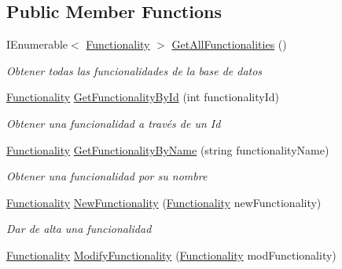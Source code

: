 \subsection*{Public Member Functions}
\begin{DoxyCompactItemize}
\item 
I\+Enumerable$<$ \hyperlink{class_h_k_supply_1_1_models_1_1_functionality}{Functionality} $>$ \hyperlink{class_h_k_supply_1_1_services_1_1_implementations_1_1_e_f_functionality_ab92f666d01076cffafbddbb91c5cf6af}{Get\+All\+Functionalities} ()
\begin{DoxyCompactList}\small\item\em Obtener todas las funcionalidades de la base de datos \end{DoxyCompactList}\item 
\hyperlink{class_h_k_supply_1_1_models_1_1_functionality}{Functionality} \hyperlink{class_h_k_supply_1_1_services_1_1_implementations_1_1_e_f_functionality_a0aa6fc75b8f1ddf6532f39a84bc50ad9}{Get\+Functionality\+By\+Id} (int functionality\+Id)
\begin{DoxyCompactList}\small\item\em Obtener una funcionalidad a través de un Id \end{DoxyCompactList}\item 
\hyperlink{class_h_k_supply_1_1_models_1_1_functionality}{Functionality} \hyperlink{class_h_k_supply_1_1_services_1_1_implementations_1_1_e_f_functionality_a655784ce048904e9f27a827ccf2a7a79}{Get\+Functionality\+By\+Name} (string functionality\+Name)
\begin{DoxyCompactList}\small\item\em Obtener una funcionalidad por su nombre \end{DoxyCompactList}\item 
\hyperlink{class_h_k_supply_1_1_models_1_1_functionality}{Functionality} \hyperlink{class_h_k_supply_1_1_services_1_1_implementations_1_1_e_f_functionality_a43852b181d280c78c7c00b9d11c6d6c4}{New\+Functionality} (\hyperlink{class_h_k_supply_1_1_models_1_1_functionality}{Functionality} new\+Functionality)
\begin{DoxyCompactList}\small\item\em Dar de alta una funcionalidad \end{DoxyCompactList}\item 
\hyperlink{class_h_k_supply_1_1_models_1_1_functionality}{Functionality} \hyperlink{class_h_k_supply_1_1_services_1_1_implementations_1_1_e_f_functionality_ae4f83037cd6ef526f55de1a2ba442cc6}{Modify\+Functionality} (\hyperlink{class_h_k_supply_1_1_models_1_1_functionality}{Functionality} mod\+Functionality)

\end{DoxyCompactItemize}
